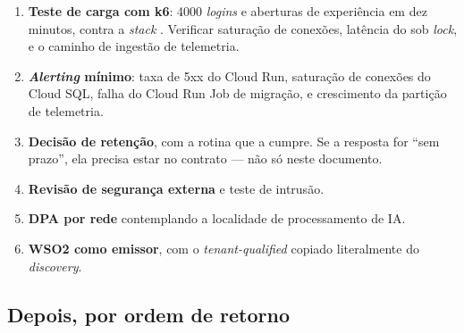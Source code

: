 \begin{enumerate}
  \item \textbf{Teste de carga com k6}: \num{4000} \emph{logins} e aberturas de
    experiência em dez minutos, contra a \emph{stack} . Verificar
    saturação de conexões, latência do  sob \emph{lock}, e o
    caminho de ingestão de telemetria.
  \item \textbf{\emph{Alerting} mínimo}: taxa de 5xx do Cloud Run, saturação de
    conexões do Cloud SQL, falha do Cloud Run Job de migração, e crescimento da
    partição  de telemetria.
  \item \textbf{Decisão de retenção}, com a rotina que a cumpre. Se a resposta for
    \enquote{sem prazo}, ela precisa estar no contrato --- não só neste documento.
  \item \textbf{Revisão de segurança externa} e teste de intrusão.
  \item \textbf{DPA por rede} contemplando a localidade de processamento de IA.
  \item \textbf{WSO2 como emissor}, com o  \emph{tenant-qualified} copiado
    literalmente do \emph{discovery}.
\end{enumerate}

\subsection{Depois, por ordem de retorno}

